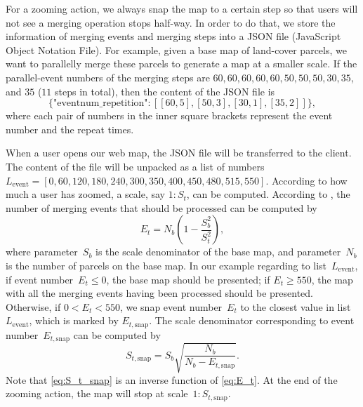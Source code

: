 \documentclass[ijgi,article,submit,moreauthors,pdftex]{Definitions/mdpi}
\begin{document}
For a zooming action, 
we always snap the map to a certain step
so that users will not see a merging operation stops half-way.
In order to do that, we store the information of
merging events and merging steps into 
a JSON file (JavaScript Object Notation File).
For example, given a base map of land-cover parcels,
we want to parallelly merge these parcels to generate a map
at a smaller scale.
If the parallel-event numbers of the merging steps are 
$60, 60, 60, 60, 60, 50, 50, 50, 30, 35$, and $35$ ($11$ steps in total),
then the content of the JSON file is
$$
\{\textrm{"eventnum\_repetition"}: [[60, 5], [50, 3], [30, 1], [35, 2]]\},
$$
where each pair of numbers in the inner square brackets 
represent the event number and the repeat times.


When a user opens our web map,
the JSON file will be transferred to the client.
The content of the file will be unpacked as 
a list of numbers~$L_\mathrm{event} = 
[0, 60, 120, 180, 240, 300, 350, 400, 450, 480, 515, 550]$.
According to how much a user has zoomed,
a scale, say $1:S_t$, can be computed.
According to \citet{Huang2016Webmap},
the number of merging events that should be processed can be computed by
\begin{equation}
\label{eq:E_t}
E_t = N_b \left(1-\frac{S^2_b}{S^2_t}\right),
\end{equation}
where parameter~$S_b$ is the scale denominator of the base map,
and parameter~$N_b$ is the number of parcels on the base map.
In our example regarding to list~$L_\mathrm{event}$,
if event number~$E_t \le 0$, the base map should be presented;
if $E_t \ge 550$, the map with all the merging events having been processed
should be presented.
Otherwise, if $0<E_t < 550$, we snap event number~$E_t$ 
to the closest value in list~$L_\mathrm{event}$,
which is marked by $E_{t,\mathrm{snap}}$.
The scale denominator corresponding to event number~$E_{t,\mathrm{snap}}$
can be computed by 
\begin{equation}
\label{eq:S_t_snap}
S_{t,\mathrm{snap}} = S_b \sqrt{\frac{N_b}{N_b-E_{t,\mathrm{snap}}}}.
\end{equation}
Note that \eq\ref{eq:S_t_snap} is an inverse function of \eq\ref{eq:E_t}.
At the end of the zooming action, 
the map will stop at scale~$1:S_{t,\mathrm{snap}}$.


\end{document}
